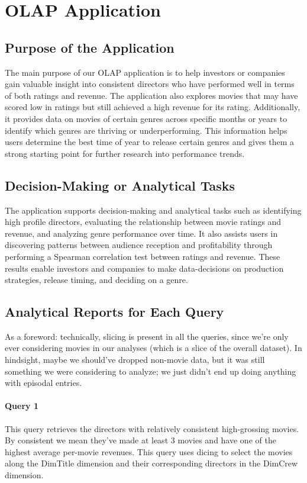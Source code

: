\section{OLAP Application}

\subsection{Purpose of the Application}

The main purpose of our OLAP application is to help investors or companies gain valuable insight into consistent directors who have performed well in terms of both ratings and revenue. The application also explores movies that may have scored low in ratings but still achieved a high revenue for its rating. Additionally, it provides data on movies of certain genres across specific months or years to identify which genres are thriving or underperforming. This information helps users determine the best time of year to release certain genres and gives them a strong starting point for further research into performance trends.

\subsection{Decision-Making or Analytical Tasks}

The application supports decision-making and analytical tasks such as identifying high profile directors, evaluating the relationship between movie ratings and revenue, and analyzing genre performance over time. It also assists users in discovering patterns between audience reception and profitability through performing a Spearman correlation test between ratings and revenue. These results enable investors and companies to make data-decisions on production strategies, release timing, and deciding on a genre.

\subsection{Analytical Reports for Each Query}

As a foreword: technically, slicing is present in all the queries, since we’re only ever considering movies in our analyses (which is a slice of the overall dataset). In hindsight, maybe we should've dropped non-movie data, but it was still something we were considering to analyze; we just didn't end up doing anything with episodal entries.

\paragraph{Query 1}
This query retrieves the directors with relatively consistent high-grossing movies. By consistent we mean they’ve made at least 3 movies and have one of the highest average per-movie revenues. This query uses dicing to select the movies along the DimTitle dimension and their corresponding directors in the DimCrew dimension.

